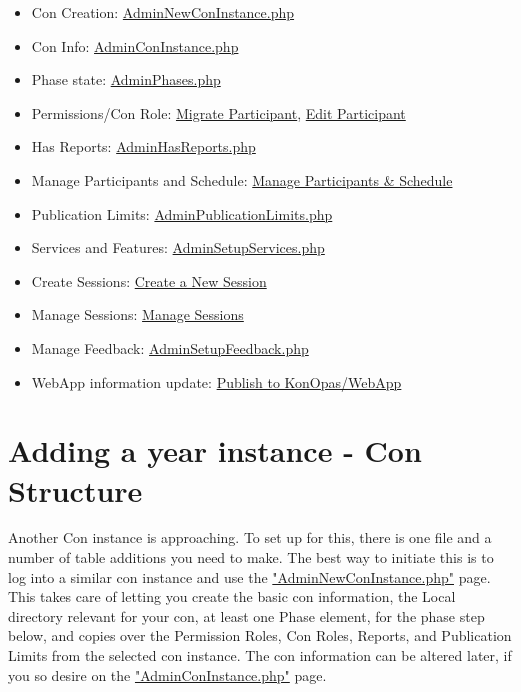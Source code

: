 \documentclass[captions=tablesignature]{scrartcl}
\begin{document}
\begin{itemize}
\item Con Creation: \href{../webpages/AdminNewConInstance.php}{AdminNewConInstance.php}
\item Con Info: \href{../webpages/AdminConInstance.php}{AdminConInstance.php}
\item Phase state: \href{../webpages/AdminPhases.php}{AdminPhases.php}
\item Permissions/Con Role: \href{../webpages/StaffEditCreateParticipant.php?action=migrate}{Migrate Participant}, \href{../webpages/StaffEditCreateParticipant.php?action=edit}{Edit Participant}
\item Has Reports: \href{../webpages/AdminHasReports.php}{AdminHasReports.php}
\item Manage Participants and Schedule: \href{../webpages/StaffManageParticipants.php}{Manage Participants \& Schedule}
\item Publication Limits: \href{../webpages/AdminPublicationLimits.php}{AdminPublicationLimits.php}
\item Services and Features: \href{../webpages/AdminSetupServices.php}{AdminSetupServices.php}
\item Create Sessions: \href{../webpages/CreateSession.php}{Create a New Session}
\item Manage Sessions: \href{../webpages/StaffManageSessions.php}{Manage Sessions}
\item Manage Feedback: \href{../webpages/AdminSetupFeedback.php}{AdminSetupFeedback.php}
\item WebApp information update: \href{../webpages/KonOpasData.php}{Publish to KonOpas/WebApp}
\end{itemize}

\section{Adding a year instance - Con Structure}
\label{sec-11}

Another Con instance is approaching.  To set up for this, there is
one file and a number of table additions you need to make.  The best
way to initiate this is to log into a similar con instance and use
the \href{../webpages/AdminNewConInstance.php}{"AdminNewConInstance.php"} page.  This takes care of letting you
create the basic con information, the Local directory relevant for
your con, at least one Phase element, for the phase step below, and
copies over the Permission Roles, Con Roles, Reports, and
Publication Limits from the selected con instance.  The con
information can be altered later, if you so desire on the
\href{../webpages/AdminConInstance.php}{"AdminConInstance.php"} page.
\end{document}
